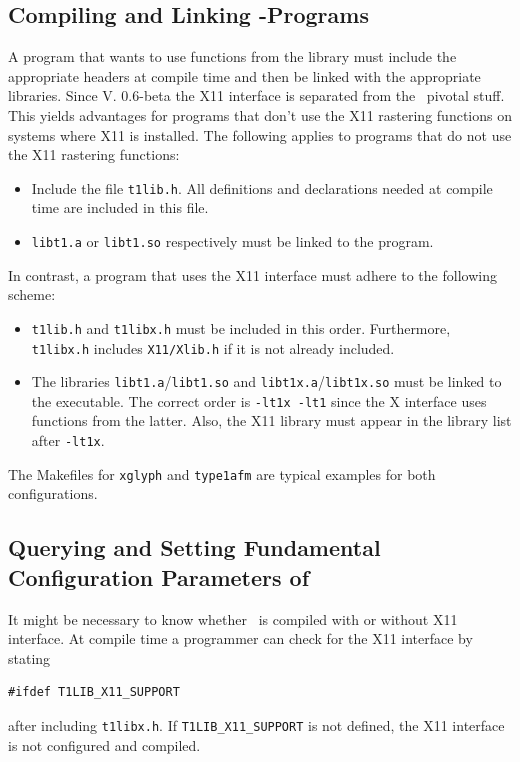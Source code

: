 \subsection{Compiling and Linking \tonelib-Programs}
\label{compilingprograms}%
A program that wants to use functions from the library must include
the appropriate headers at compile time and then be linked with the
appropriate libraries. Since V. 0.6-beta the X11 interface is separated
from the \tonelib\ pivotal stuff. This yields advantages for programs that
don't use the X11 rastering functions on systems where X11 is
installed. 
The following applies to programs that do not use the X11 rastering
functions: 
\begin{itemize}
\item Include the file \verb+t1lib.h+. All definitions and declarations
  needed at compile time are included in this file.
\item \verb+libt1.a+ or \verb+libt1.so+ respectively must be linked to the
  program. 
\end{itemize}
In contrast, a program that uses the X11 interface must adhere to the
following scheme:
\begin{itemize}
\item \verb+t1lib.h+ and \verb+t1libx.h+ must be included in this
  order. Furthermore, \verb+t1libx.h+ includes \verb+X11/Xlib.h+ if
  it is not already included.
\item The libraries \verb+libt1.a+/\verb+libt1.so+ and
  \verb+libt1x.a+/\verb+libt1x.so+ must be linked to the executable. 
  The correct order is \verb+-lt1x -lt1+ since the X interface uses
  functions from the latter. Also, the X11 library must appear in the
  library list after \verb+-lt1x+.
\end{itemize}
The Makefiles for \verb+xglyph+ and \verb+type1afm+ are typical
examples for both configurations.


\subsection{Querying and Setting Fundamental Configuration Parameters of \tonelib}
\label{queryconfiguration}%
It might be necessary to know whether \tonelib\ is compiled with or without
X11 interface. At compile time a programmer can check for the X11 interface by
stating
\begin{verbatim}
#ifdef T1LIB_X11_SUPPORT
\end{verbatim}
after including \verb+t1libx.h+. If \verb+T1LIB_X11_SUPPORT+ is not defined,
the X11 interface is not configured and compiled.

